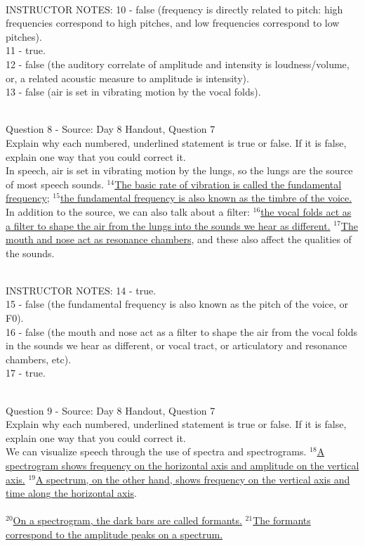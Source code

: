 \documentclass[12pt]{article}
\begin{document}
~\\
INSTRUCTOR NOTES: 10 - false (frequency is directly related to pitch: high frequencies correspond to high pitches, and low frequencies correspond to low pitches).\\11 - true.\\12 - false (the auditory correlate of amplitude and intensity is loudness/volume, or, a related acoustic measure to amplitude is intensity).\\13 - false (air is set in vibrating motion by the vocal folds).


~\\

{\large Question 8} - Source: Day 8 Handout, Question 7\\

Explain why each numbered, underlined statement is true or false. If it is false, explain one way that you could correct it.\\

In speech, air is set in vibrating motion by the lungs, so the lungs are the source of most speech sounds. $^{14}$\ul{The basic rate of vibration is called the fundamental frequency}; $^{15}$\ul{the fundamental frequency is also known as the timbre of the voice.} In addition to the source, we can also talk about a filter: $^{16}$\ul{the vocal folds act as a filter to shape the air from the lungs into the sounds we hear as different.} $^{17}$\ul{The mouth and nose act as resonance chambers}, and these also affect the qualities of the sounds.


~\\
INSTRUCTOR NOTES: 14 - true.\\15 - false (the fundamental frequency is also known as the pitch of the voice, or F0).\\16 - false (the mouth and nose act as a filter to shape the air from the vocal folds in the sounds we hear as different, or vocal tract, or articulatory and resonance chambers, etc).\\17 - true.


~\\

{\large Question 9} - Source: Day 8 Handout, Question 7\\

Explain why each numbered, underlined statement is true or false. If it is false, explain one way that you could correct it.\\

We can visualize speech through the use of spectra and spectrograms. $^{18}$\ul{A spectrogram shows frequency on the horizontal axis and amplitude on the vertical axis.} $^{19}$\ul{A spectrum, on the other hand, shows frequency on the vertical axis and time along the horizontal axis}.\\\\$^{20}$\ul{On a spectrogram, the dark bars are called formants.} $^{21}$\ul{The formants correspond to the amplitude peaks on a spectrum.}
\end{document}
